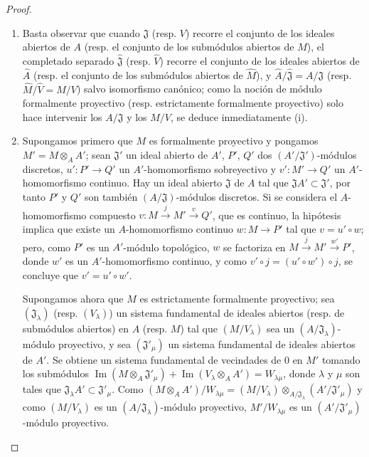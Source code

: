 \begin{proof}
\begin{enumerate}
  \item[(i)] Basta observar que cuando $\mathfrak J$ (resp. $V$)
  recorre el conjunto de los ideales abiertos de $A$ (resp. el conjunto de los
  submódulos abiertos de $M$), el completado separado $\hat{\mathfrak J}$
  (resp. $\hat V$) recorre el conjunto de los ideales abiertos de $\hat A$
  (resp. el conjunto de los submódulos abiertos de $\hat M$), y
  $\hat A/\hat{\mathfrak J}=A/\mathfrak J$ (resp.
  $\hat M/\hat V=M/V$) salvo isomorfismo canónico; como la noción
  de módulo formalmente proyectivo (resp. estrictamente formalmente proyectivo)
  solo hace intervenir los $A/\mathfrak J$ y los $M/V$, se deduce
  inmediatamente (i).
  \item[(ii)] Supongamos primero que $M$ es formalmente proyectivo y pongamos
  $M'=M\otimes_A A'$; sean $\mathfrak J'$ un ideal abierto de $A'$, $P'$,
  $Q'$ dos $(A'/\mathfrak J')$-módulos discretos, $u':P'\to Q'$ un
  $A'$-homomorfismo sobreyectivo y $v':M'\to Q'$ un $A'$-homomorfismo continuo.
  Hay un ideal abierto $\mathfrak J$ de $A$ tal que
  $\mathfrak JA'\subset\mathfrak J'$, por tanto $P'$ y $Q'$ son también
  $(A/\mathfrak J)$-módulos discretos. Si se considera el
  $A$-homomorfismo compuesto $v:M\xrightarrow{j}M'\xrightarrow{v}Q'$, que es
  continuo, la hipótesis implica que existe un $A$-homomorfismo continuo
  $w:M\to P'$ tal que $v=u'\circ w$; pero, como $P'$ es un $A'$-módulo
  topológico, $w$ se factoriza en
  $M\xrightarrow{j}M'\xrightarrow{w'}P'$, donde $w'$ es un $A'$-homomorfismo
  continuo, y como $v'\circ j=(u'\circ w')\circ j$, se concluye que
  $v'=u'\circ w'$.

  Supongamos ahora que $M$ es estrictamente formalmente proyectivo; sea
  $(\mathfrak J_\lambda)$ (resp. $(V_\lambda)$) un sistema fundamental
  de ideales abiertos (resp. de submódulos abiertos) en $A$ (resp. $M$) tal
  que $(M/V_\lambda)$ sea un $(A/\mathfrak J_\lambda)$-módulo proyectivo,
  y sea $(\mathfrak J'_\mu)$ un sistema fundamental de ideales abiertos de
  $A'$. Se obtiene un sistema fundamental de vecindades de $0$ en $M'$ tomando
  los submódulos
  $\operatorname{Im}(M\otimes_A\mathfrak J'_\mu)
    +\operatorname{Im}(V_\lambda\otimes_A A')=W_{\lambda\mu}$,
  donde $\lambda$ y $\mu$ son tales que
  $\mathfrak J_\lambda A'\subset\mathfrak J'_\mu$. Como
  $(M\otimes_A A')/W_{\lambda\mu}
    =(M/V_\lambda)\otimes_{A/\mathfrak J_\lambda}
      (A'/\mathfrak J'_\mu)$
  y como $(M/V_\lambda)$ es un
  $(A/\mathfrak J_\lambda)$-módulo proyectivo, $M'/W_{\lambda\mu}$
  es un $(A'/\mathfrak J'_\mu)$-módulo proyectivo.
\end{enumerate}
\end{proof}

